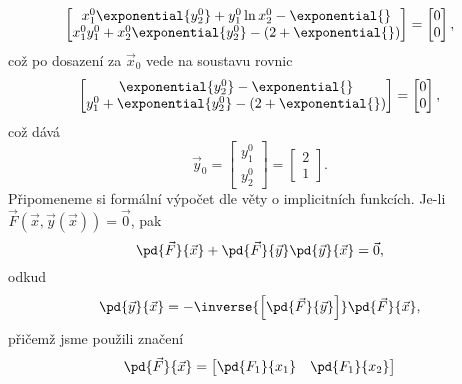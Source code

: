 \documentclass[answers]{exam}
\begin{document}
\begin{questions}
\begin{solution}
\begin{equation*}
\begin{bmatrix}
        x_1^0\exponential{y_2^0} + y_1^0 \ln x_2^0 - \exponential{}  \\
        x_1^0 y_1^0 + x_2^0 \exponential{y_2^0} - (2 + \exponential{})
      \end{bmatrix}
      =
      \begin{bmatrix}
        0 \\
        0
      \end{bmatrix}
      ,
    \end{equation*}
    což po dosazení za $\vec{x}_0$ vede na soustavu rovnic
    \begin{equation*}
      \begin{bmatrix}
        \exponential{y_2^0}  - \exponential{}  \\
        y_1^0 + \exponential{y_2^0} - (2 + \exponential{})
      \end{bmatrix}
      =
      \begin{bmatrix}
        0 \\
        0
      \end{bmatrix}
      ,
    \end{equation*} 
    což dává
    \begin{equation*}
      \vec{y}_0
      =
      \begin{bmatrix}
        y_1^0
        \\
        y_2^0
      \end{bmatrix}
      =
      \begin{bmatrix}
        2 \\
        1
      \end{bmatrix}
      .
    \end{equation*}
    Připomeneme si formální výpočet dle věty o implicitních funkcích. Je-li $\vec{F}(\vec{x}, \vec{y}(\vec{x})) = \vec{0}$, pak
    \begin{equation*}
      \pd{\vec{F}}{\vec{x}} + \pd{\vec{F}}{\vec{y}} \pd{\vec{y}}{\vec{x}} = \vec{0},
    \end{equation*}
    odkud
    \begin{equation*}
      \pd{\vec{y}}{\vec{x}}
      =
      -
      \inverse{
        \left[
          \pd{\vec{F}}{\vec{y}}
        \right]
      }
      \pd{\vec{F}}{\vec{x}}
      ,
    \end{equation*}
    přičemž jsme použili značení
    \begin{equation*}
      \pd{\vec{F}}{\vec{x}}
      =
      \begin{bmatrix}
        \pd{F_1}{x_1} & \pd{F_1}{x_2} \\

\end{bmatrix}
\end{equation*}
\end{solution}
\end{questions}
\end{document}
